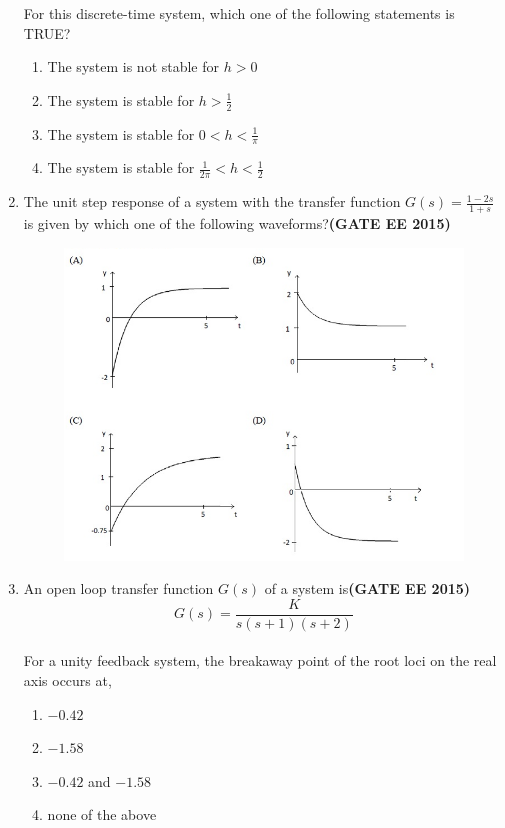 \documentclass[a4paper,12pt]{exam}
\theoremstyle{remark}
\begin{document}
\begin{enumerate}
For this discrete-time system, which one of the following statements is TRUE?
    \begin{enumerate}
        \item The system is not stable for $h > 0$
        \item The system is stable for $h > \frac{1}{2}$
        \item The system is stable for $0 < h < \frac{1}{\pi}$
        \item The system is stable for $\frac{1}{2\pi} < h < \frac{1}{2}$
    \end{enumerate}
\item The unit step response of a system with the transfer function $G(s) = \frac{1 - 2s}{1 + s}$ is given by which one of the following waveforms?\hfill{\textbf{(GATE EE 2015)}}
  \begin{figure}[H]
      \centering
      \includegraphics[width=1\columnwidth]{figs/2Q 63.png}
      \caption{}
      \label{fig:placeholder}
  \end{figure}

\item An open loop transfer function $G(s)$ of a system is\hfill{\textbf{(GATE EE 2015)}}
$$
G(s) = \frac{K}{s(s+1)(s+2)}
$$\\
For a unity feedback system, the breakaway point of the root loci on the real axis occurs at,
\begin{multicols}{2}
        \begin{enumerate}
        \item $-0.42$
        \item $-1.58$
        \item $-0.42$ and $-1.58$
        \item none of the above
    \end{enumerate}
\end{multicols}



\end{enumerate}
\end{document}
